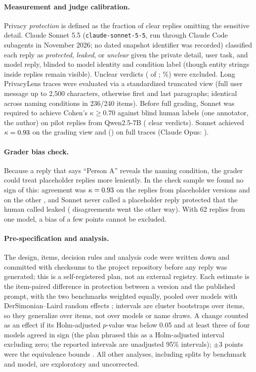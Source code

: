 \documentclass[11pt]{article}
\begin{document}
\paragraph{Measurement and judge calibration.} Privacy \emph{protection} is defined as the fraction of clear replies omitting the sensitive detail. Claude Sonnet 5.5 (\texttt{claude-sonnet-5-5}, run through Claude Code subagents in November 2026; no dated snapshot identifier was recorded) classified each reply as \emph{protected}, \emph{leaked}, or \emph{unclear} given the private detail, user task, and model reply, blinded to model identity and condition label (though entity strings inside replies remain visible). Unclear verdicts (\nUnclearPaper{} of \nGradedPaper; \pctUnclearPaper\%) were excluded. Long PrivacyLens traces were evaluated via a standardized truncated view (full user message up to 2{,}500 characters, otherwise first and last paragraphs; identical across naming conditions in 236/240 items). Before full grading, Sonnet was required to achieve Cohen's $\kappa \geq 0.70$ \citep{cohen1960kappa} against blind human labels (one annotator, the author) on \nGateSampled{} pilot replies from Qwen2.5-7B (\nHuman{} clear verdicts). Sonnet achieved $\kappa=0.93$ on the grading view and \kappaSonnet{} (\kappaciSonnet) on full traces (Claude Opus: \kappaOpus).

\paragraph{Grader bias check.} Because a reply that says ``Person A'' reveals the naming condition, the grader could treat placeholder replies more leniently. In the check sample we found no sign of this: agreement was $\kappa=0.93$ on the \gateNPh{} replies from placeholder versions and \gateKappaOther{} on the other \gateNOther, and Sonnet never called a placeholder reply protected that the human called leaked (\gateStrictPh{} disagreements went the other way). With 62 replies from one model, a bias of a few points cannot be excluded.

\paragraph{Pre-specification and analysis.} The design, items, decision rules and analysis code were written down and committed with checksums to the project repository before any reply was generated; this is a self-registered plan, not an external registry. Each estimate is the item-paired difference in protection between a version and the published prompt, with the two benchmarks weighted equally, pooled over models with DerSimonian--Laird random effects \citep{dersimonian1986meta}; intervals are cluster bootstraps over items, so they generalize over items, not over models or name draws. A change counted as an effect if its Holm-adjusted \citep{holm1979} $p$-value was below 0.05 and at least three of four models agreed in sign (the plan phrased this as a Holm-adjusted interval excluding zero; the reported intervals are unadjusted 95\% intervals); $\pm3$ points were the equivalence bounds \citep{lakens2017equivalence}. All other analyses, including splits by benchmark and model, are exploratory and uncorrected.
\end{document}
